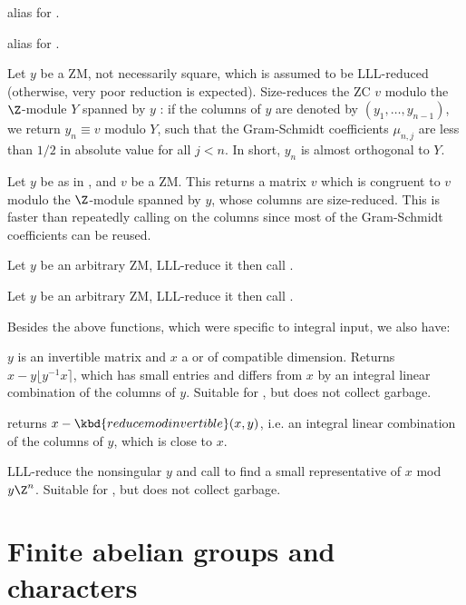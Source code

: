  alias for .

 alias for .

 Let $y$ be a ZM, not necessarily
square, which is assumed to be LLL-reduced (otherwise, very poor reduction is
expected). Size-reduces the ZC $v$ modulo the $\Z$-module $Y$ spanned by $y$
: if the columns of $y$ are denoted by $(y_1,\dots, y_{n-1})$, we return $y_n
\equiv v$ modulo $Y$, such that the Gram-Schmidt coefficients $\mu_{n,j}$ are
less than $1/2$ in absolute value for all $j < n$. In short, $y_n$ is almost
orthogonal to $Y$.

 Let $y$ be as in
, and $v$ be a ZM. This returns a matrix $v$ which is
congruent to $v$ modulo the $\Z$-module spanned by $y$, whose columns are
size-reduced. This is faster than repeatedly calling 
on the columns since most of the Gram-Schmidt coefficients can be reused.

 Let $y$ be an arbitrary ZM,
LLL-reduce it then call .

 Let $y$ be an arbitrary ZM,
LLL-reduce it then call .

Besides the above functions, which were specific to integral input, we also
have:

 $y$ is an invertible matrix
and $x$ a  or  of compatible dimension.
Returns $x - y\lfloor y^{-1}x \rceil$, which has small entries and differs
from $x$ by an integral linear combination of the columns of $y$. Suitable
for , but does not collect garbage.

 returns $x -
\kbd{reducemodinvertible}(x,y)$, i.e. an integral linear combination of
the columns of $y$, which is close to $x$.

 LLL-reduce the nonsingular  $y$
and call  to find a small representative of $x$ mod $y
\Z^n$. Suitable for , but does not collect garbage.

\section{Finite abelian groups and characters}

